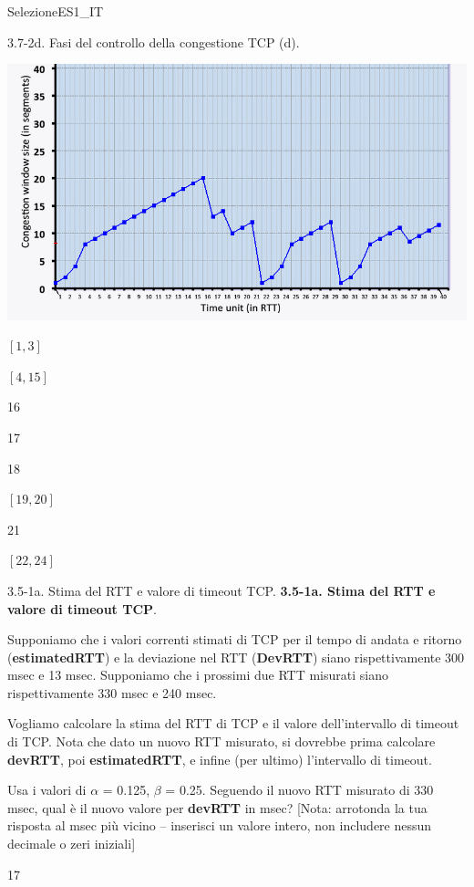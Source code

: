 \documentclass[a4paper]{article}
\begin{document}
\begin{quiz}{SelezioneES1\_IT}
\begin{multi}[points=1,shuffle]{3.7-2d. Fasi del controllo della congestione TCP (d).}
\begin{center}
	\includegraphics[width=\linewidth]{figs/tcp_cc_evolution.jpg}
\end{center}
\item $[1,3]$
\item $[4,15]$
\item 16
\item 17
\item 18
\item $[19,20]$
\item* 21
\item $[22,24]$
\end{multi}

\begin{shortanswer}[points=1,shuffle]{3.5-1a. Stima del RTT e valore di timeout TCP.}
\textbf{3.5-1a. Stima del RTT e valore di timeout TCP}.

Supponiamo che i valori correnti stimati di TCP per il tempo di andata e ritorno (\textbf{estimatedRTT}) e la deviazione nel RTT (\textbf{DevRTT}) siano rispettivamente 300 msec e 13 msec. Supponiamo che i prossimi due RTT misurati siano rispettivamente 330 msec e 240 msec.

Vogliamo calcolare la stima del RTT di TCP e il valore dell'intervallo di timeout di TCP. Nota che dato un nuovo RTT misurato, si dovrebbe prima calcolare \textbf{devRTT}, poi \textbf{estimatedRTT}, e infine (per ultimo) l'intervallo di timeout.

Usa i valori di $\alpha$ = 0.125, $\beta$ = 0.25. Seguendo il nuovo RTT misurato di 330 msec, qual è il nuovo valore per \textbf{devRTT} in msec? [Nota: arrotonda la tua risposta al msec più vicino -- inserisci un valore intero, non includere nessun decimale o zeri iniziali]
\item* 17
\end{shortanswer}

\end{quiz}
\end{document}
